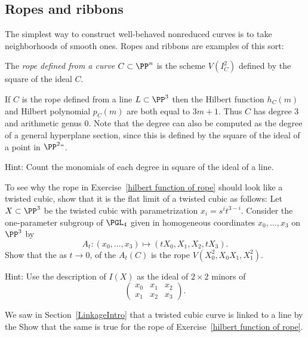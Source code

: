 \subsection*{Ropes and ribbons}
The simplest way to construct well-behaved nonreduced curves is
to take neighborhoods of smooth ones. Ropes and ribbons are examples of
this sort:


\begin{definition}
The \emph{rope defined from a curve $C \subset \PP^n$} is the scheme
$V(I^2_C)$ defined by the square of the ideal $C$.
%
\unif
\end{definition}

\begin{exercise}\label{hilbert function of rope}
If $C$ is the rope defined from a line $L\subset \PP^3$ then the Hilbert
function $h_C(m)$ and Hilbert polynomial $p_C(m)$ are both equal to
$3m+1$. Thus $C$ has degree 3 and
arithmetic genus 0. Note that the degree can also be computed as the
degree of
a general hyperplane section, since this is defined by the square of
the ideal of a point
in $\PP^2` `$.

Hint: Count the monomials of each degree in square of the ideal of a line.
\end{exercise}

\begin{exercise} To see why the rope in Exercise~\ref{hilbert function
of rope} should look like a twisted cubic, show that it is the flat
limit of a twisted cubic as follows:
Let $X \subset \PP^3$ be the twisted cubic with parametrization $x_i =
s^it^{3-i}$. Consider the one-parameter subgroup of $\PGL_4$ given in
homogeneous coordinates $x_0,\dots, x_3$ on $\PP^3$ by
$$
A_t : (x_0,\dots,x_3) \mapsto (tX_0, X_1, X_2,tX_3).
$$
Show that the 
%
 as $t\to 0$, of the 
%
 $A_t(C)$
is the rope $V(X_0^2, X_0X_1,X_1^2)$.

Hint: Use the description of $I(X)$ as the ideal of $2\times 2$ minors of
$$
\begin{pmatrix}
x_0 &x_1&x_2\\
x_1& x_2& x_3
\end{pmatrix}
.
$$
\end{exercise}


\begin{exercise}\label{line and rope}
We saw in Section~\ref{LinkageIntro} that a twisted cubic curve is linked
to a line by the 
%
Show that the same is true for the rope of
Exercise~\ref{hilbert function of rope}.
\end{exercise}

